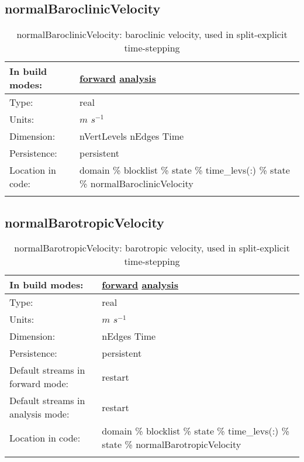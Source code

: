 \subsection[normalBaroclinicVelocity]{normalBaroclinicVelocity}
\label{subsec:var_sec_state_normalBaroclinicVelocity}
\begin{center}
\begin{longtable}{| p{2.0in} | p{4.0in} |}
        \hline 
        In build modes: & \hyperref[subsec:forward_var_tab_state]{forward} \hyperref[subsec:analysis_var_tab_state]{analysis} \\
        \hline 
        Type: & real \\
        \hline 
        Units: & $m$ $s^{-1}$ \\
        \hline 
        Dimension: & nVertLevels nEdges Time \\
        \hline 
        Persistence: & persistent \\
        \hline 
		 Location in code: & domain \% blocklist \% state \% time\_levs(:) \% state \% normalBaroclinicVelocity \\
		 \hline 
    \caption{normalBaroclinicVelocity: baroclinic velocity, used in split-explicit time-stepping}
\end{longtable}
\end{center}
\subsection[normalBarotropicVelocity]{normalBarotropicVelocity}
\label{subsec:var_sec_state_normalBarotropicVelocity}
\begin{center}
\begin{longtable}{| p{2.0in} | p{4.0in} |}
        \hline 
        In build modes: & \hyperref[subsec:forward_var_tab_state]{forward} \hyperref[subsec:analysis_var_tab_state]{analysis} \\
        \hline 
        Type: & real \\
        \hline 
        Units: & $m$ $s^{-1}$ \\
        \hline 
        Dimension: & nEdges Time \\
        \hline 
        Persistence: & persistent \\
        \hline 
		 Default streams in forward mode: &  restart \\
        \hline 
		 Default streams in analysis mode: &  restart \\
        \hline 
		 Location in code: & domain \% blocklist \% state \% time\_levs(:) \% state \% normalBarotropicVelocity \\
		 \hline 
    \caption{normalBarotropicVelocity: barotropic velocity, used in split-explicit time-stepping}
\end{longtable}
\end{center}
